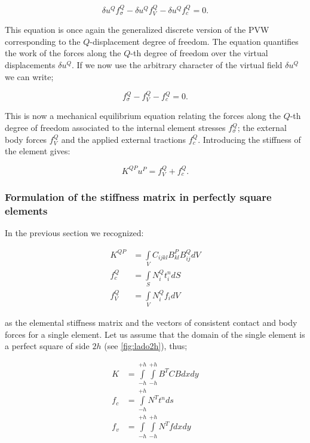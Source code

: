 \[ \delta u^Q f_\sigma ^Q - \delta {u^Q}f_V^Q - \delta u^Q f_c^Q = 0. \]

This equation is once again the generalized discrete version of the PVW corresponding to the $Q$-displacement degree of freedom. The equation quantifies the work of the forces along the $Q$-th degree of freedom over the virtual displacements $\delta u^Q$. If we now use the arbitrary character of the virtual field $\delta u^Q $ we can write;

\begin{equation}
f_\sigma ^Q - f_V^Q - f_c^Q = 0.
\label{forces}
\end{equation}

This is now a mechanical equilibrium equation relating the forces along the $Q$-th degree of freedom associated to the internal element stresses $f_\sigma ^Q$; the external body forces $f_V^Q$ and the applied external tractions $f_c^Q$. Introducing the stiffness of the element gives:

\begin{equation}
K^{QP} u^P = f_V^Q + f_c^Q.
\label{Discreta}
\end{equation}

\subsubsection{Formulation of the stiffness matrix in perfectly square elements}
In the previous section we recognized:

\begin{equation}
\begin{aligned}
{K^{QP}} & = \int\limits_V {{C_{ijkl}}B_{kl}^PB_{ij}^QdV} \\
f_c^Q    & = \int\limits_S {N_i^Qt_i^ndS} \\
f_V^Q    & = \int\limits_V {N_i^Q{f_i}dV}
\label{Rigi}
\end{aligned}
\end{equation}



as the elemental stiffness matrix and the vectors of consistent contact and body forces for a single element. Let us assume that the domain of the single element is a perfect square of side $2h$ (see \cref{fig:lado2h}), thus;

\begin{equation}
\begin{aligned}
K & = \int\limits_{ - h}^{ + h} {\int\limits_{ - h}^{ + h} {{B^T}CBdxdy} } \\
{f_c} & = \int\limits_{ - h}^{ + h} {{N^T}{t^n}ds} \\
{f_v} & = \int\limits_{ - h}^{ + h} {\int\limits_{ - h}^{ + h} {{N^T}fdxdy} }
\label{ele2}
\end{aligned}
\end{equation}

